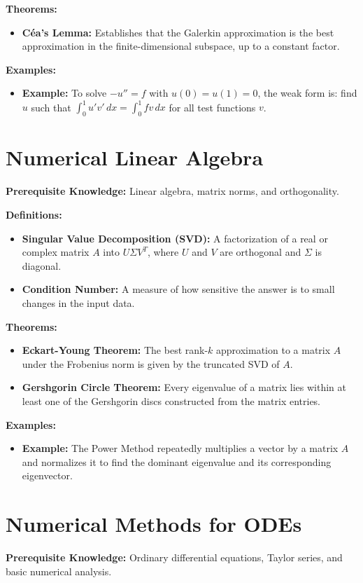 \textbf{Theorems:}
\begin{itemize}
    \item \textbf{C\'ea's Lemma:} Establishes that the Galerkin approximation is the best approximation in the finite-dimensional subspace, up to a constant factor.
\end{itemize}

\textbf{Examples:}
\begin{itemize}
    \item \textbf{Example:} To solve $-u'' = f$ with $u(0)=u(1)=0$, the weak form is: find $u$ such that $\int_0^1 u' v' \,dx = \int_0^1 f v \,dx$ for all test functions $v$.
\end{itemize}


\section{Numerical Linear Algebra}
\textbf{Prerequisite Knowledge:} Linear algebra, matrix norms, and orthogonality.

\textbf{Definitions:}
\begin{itemize}
    \item \textbf{Singular Value Decomposition (SVD):} A factorization of a real or complex matrix $A$ into $U \Sigma V^T$, where $U$ and $V$ are orthogonal and $\Sigma$ is diagonal.
    \item \textbf{Condition Number:} A measure of how sensitive the answer is to small changes in the input data.
\end{itemize}

\textbf{Theorems:}
\begin{itemize}
    \item \textbf{Eckart-Young Theorem:} The best rank-$k$ approximation to a matrix $A$ under the Frobenius norm is given by the truncated SVD of $A$.
    \item \textbf{Gershgorin Circle Theorem:} Every eigenvalue of a matrix lies within at least one of the Gershgorin discs constructed from the matrix entries.
\end{itemize}

\textbf{Examples:}
\begin{itemize}
    \item \textbf{Example:} The Power Method repeatedly multiplies a vector by a matrix $A$ and normalizes it to find the dominant eigenvalue and its corresponding eigenvector.
\end{itemize}


\section{Numerical Methods for ODEs}
\textbf{Prerequisite Knowledge:} Ordinary differential equations, Taylor series, and basic numerical analysis.

